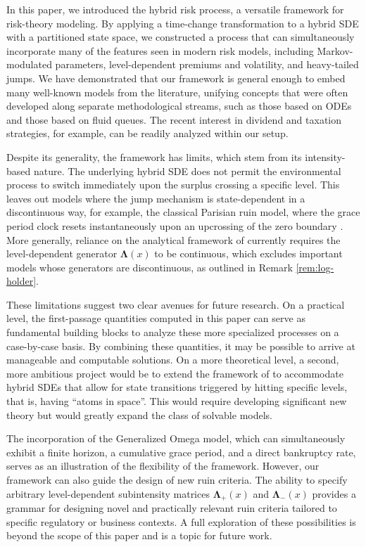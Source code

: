 \documentclass[11pt]{article}
\numberwithin{table}{section}
\numberwithin{figure}{section}
\numberwithin{equation}{section}
\newcommand{\1}{{\mathbf 1}}
\newcommand{\0}{\mat{0}}
\begin{document}
In this paper, we introduced the hybrid risk process, a versatile framework for risk-theory modeling. By applying a time-change transformation to a hybrid SDE with a partitioned state space, we constructed a process that can simultaneously incorporate many of the features seen in modern risk models, including Markov-modulated parameters, level-dependent premiums and volatility, and heavy-tailed jumps. We have demonstrated that our framework is general enough to embed many well-known models from the literature, unifying concepts that were often developed along separate methodological streams, such as those based on ODEs and those based on fluid queues. The recent interest in dividend and taxation strategies, for example, can be readily analyzed within our setup.

Despite its generality, the framework has limits, which stem from its intensity-based nature. The underlying hybrid SDE does not permit the environmental process to switch immediately upon the surplus crossing a specific level. This leaves out models where the jump mechanism is state-dependent in a discontinuous way, for example, the classical Parisian ruin model, where the grace period clock resets instantaneously upon an upcrossing of the zero boundary \cite{bladt2019parisian}. More generally, reliance on the analytical framework of \cite{albrecher2022space} currently requires the level-dependent generator $\bm{\Lambda}(x)$ to be continuous, which excludes important models whose generators are discontinuous, as outlined in Remark \ref{rem:log-holder}.

These limitations suggest two clear avenues for future research. On a practical level, the first-passage quantities computed in this paper can serve as fundamental building blocks to analyze these more specialized processes on a case-by-case basis. By combining these quantities, it may be possible to arrive at manageable and computable solutions. On a more theoretical level, a second, more ambitious project would be to extend the framework of \cite{albrecher2022space} to accommodate hybrid SDEs that allow for state transitions triggered by hitting specific levels, that is, having ``atoms in space''. This would require developing significant new theory but would greatly expand the class of solvable models.

The incorporation of the Generalized Omega model, which can simultaneously exhibit a finite horizon, a cumulative grace period, and a direct bankruptcy rate, serves as an illustration of the flexibility of the framework. However, our framework can also guide the design of new ruin criteria. The ability to specify arbitrary level-dependent subintensity matrices \(\bm{\Lambda}_+(x)\) and \(\bm{\Lambda}_-(x)\) provides a grammar for designing novel and practically relevant ruin criteria tailored to specific regulatory or business contexts. A full exploration of these possibilities is beyond the scope of this paper and is a topic for future work.
\end{document}

